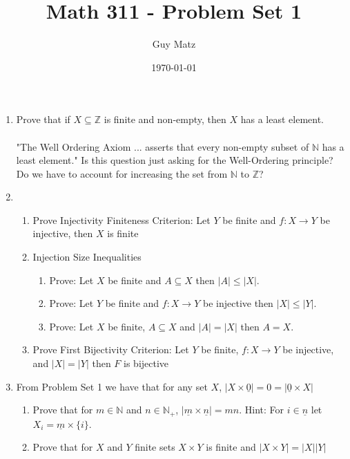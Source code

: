 \documentclass[11pt]{article}
\title{\textbf{Math 311 - Problem Set 1}}
\author{Guy Matz}
\date{\today}
\begin{document}


\begin{enumerate}  %
\item Prove that if $X \subseteq \mathbb{Z}$ is finite and non-empty, then $X$ has a least element.\\
\\
"The Well Ordering Axiom ... asserts that every non-empty subset of $\mathbb{N}$ has a least element."  Is this question just asking for the Well-Ordering principle?  Do we have to account for increasing the set from $\mathbb{N}$ to $\mathbb{Z}$?

\newpage %
\item
\begin{enumerate}
\item Prove Injectivity Finiteness Criterion:  Let $Y$ be finite and $f : X \to Y$ be injective, then $X$ is finite
\\
\item Injection Size Inequalities
\begin{enumerate}
\item Prove: Let $X$ be finite and $A \subseteq X$ then $|A| \leq |X|.$
\item Prove: Let $Y$ be finite and $f:X \to Y$ be injective then $|X| \leq |Y|$.
\item Prove: Let $X$ be finite, $A \subseteq X$ and $|A| = |X|$ then $A = X$.
\end{enumerate}
\item Prove First Bijectivity Criterion:  Let $Y$ be finite, $f:X \to Y$ be injective, and $|X| = |Y|$ then $F$ is bijective
\end{enumerate}


\newpage %
\item From Problem Set 1 we have that for any set $X$, $|X \times \underline{0}| = 0 = |\underline{0} \times X|$
\begin{enumerate}
\item Prove that for $m \in \mathbb{N}$ and $n \in \mathbb{N}_+$, $|\underline{m} \times  \underline{n}| = mn$.  Hint:  For $i \in \underline{n}$ let $X_i = \underline{m} \times \{i\}$.
\item Prove that for $X$ and $Y$ finite sets $X \times Y$ is finite and $|X \times Y| = |X||Y|$
\end{enumerate}


\end{enumerate}
\end{document}
